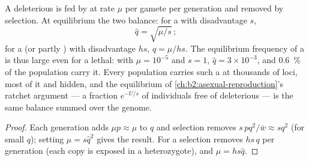 \begin{theorem}\label{thm:b2:population-genetics:balance}
A deleterious  is fed by  at rate $\mu$ per gamete
per generation and removed by selection. At equilibrium the two
balance: for a   with  disadvantage $s$,
\[
\hat q = \sqrt{\mu/s}\,;
\]
for a  (or partly )  with 
disadvantage $hs$, $\hat q = \mu/hs$. The equilibrium frequency of a
 is thus large even for a lethal: with $\mu = 10^{-5}$ and
$s = 1$, $\hat q = 3\times 10^{-3}$, and \qty{0.6}{\%} of the population
carry it. Every population carries such a \emph{} at
thousands of loci, most of it  and hidden, and the
equilibrium of \cref{ch:b2:asexual-reproduction}'s ratchet argument
--- a fraction $e^{-U/s}$ of individuals free of deleterious
 --- is the same balance summed over the genome.
\end{theorem}
\begin{proof}
Each generation  adds $\mu p \approx \mu$ to $q$ and
selection removes $s\,pq^{2}/\bar w \approx sq^{2}$ (for small $q$);
setting $\mu = s\hat q^{2}$ gives the  result. For a
  selection removes $hs\,q$ per generation (each copy
is exposed in a heterozygote), and $\mu = hs\hat q$.
\end{proof}

